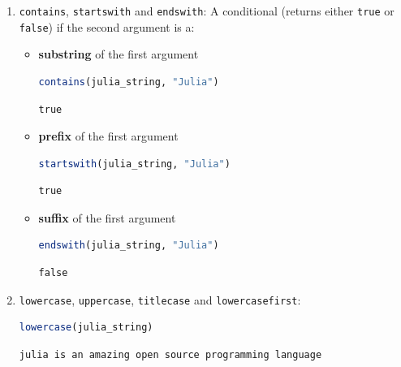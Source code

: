 \documentclass[
  notoc %
]{tufte-book}
\newcommand{\passthrough}[1]{#1}
\begin{document}
\begin{enumerate}
\def\labelenumi{\arabic{enumi}.}
\item
  \passthrough{\lstinline!contains!},
  \passthrough{\lstinline!startswith!} and
  \passthrough{\lstinline!endswith!}: A conditional (returns either
  \passthrough{\lstinline!true!} or \passthrough{\lstinline!false!}) if
  the second argument is a:

  \begin{itemize}
  \item
    \textbf{substring} of the first argument

    \begin{lstlisting}[language=Julia]
    contains(julia_string, "Julia")
    \end{lstlisting}

    \begin{lstlisting}[language=Output]
    true
    \end{lstlisting}
  \item
    \textbf{prefix} of the first argument

    \begin{lstlisting}[language=Julia]
    startswith(julia_string, "Julia")
    \end{lstlisting}

    \begin{lstlisting}[language=Output]
    true
    \end{lstlisting}
  \item
    \textbf{suffix} of the first argument

    \begin{lstlisting}[language=Julia]
    endswith(julia_string, "Julia")
    \end{lstlisting}

    \begin{lstlisting}[language=Output]
    false
    \end{lstlisting}
  \end{itemize}
\item
  \passthrough{\lstinline!lowercase!},
  \passthrough{\lstinline!uppercase!},
  \passthrough{\lstinline!titlecase!} and
  \passthrough{\lstinline!lowercasefirst!}:

  \begin{lstlisting}[language=Julia]
  lowercase(julia_string)
  \end{lstlisting}

  \begin{lstlisting}[language=Output]
  julia is an amazing open source programming language
  \end{lstlisting}


\end{enumerate}
\end{document}
